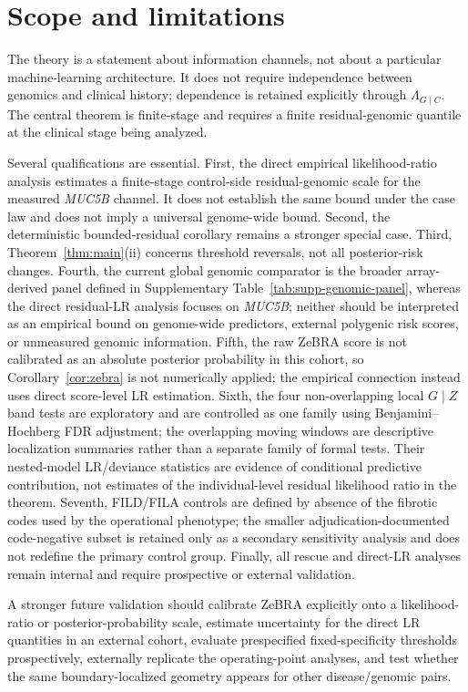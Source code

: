 \section{Scope and limitations}

The theory is a statement about information channels, not about a particular machine-learning architecture. It does not require independence between genomics and clinical history; dependence is retained explicitly through $\Lambda_{G\mid C}$. The central theorem is finite-stage and requires a finite residual-genomic quantile at the clinical stage being analyzed.

Several qualifications are essential. First, the direct empirical likelihood-ratio analysis estimates a finite-stage control-side residual-genomic scale for the measured \textit{MUC5B} channel. It does not establish the same bound under the case law and does not imply a universal genome-wide bound. Second, the deterministic bounded-residual corollary remains a stronger special case. Third, Theorem~\ref{thm:main}(ii) concerns threshold reversals, not all posterior-risk changes. Fourth, the current global genomic comparator is the broader array-derived panel defined in Supplementary Table~\ref{tab:supp-genomic-panel}, whereas the direct residual-LR analysis focuses on \textit{MUC5B}; neither should be interpreted as an empirical bound on genome-wide predictors, external polygenic risk scores, or unmeasured genomic information. Fifth, the raw ZeBRA score is not calibrated as an absolute posterior probability in this cohort, so Corollary~\ref{cor:zebra} is not numerically applied; the empirical connection instead uses direct score-level LR estimation. Sixth, the four non-overlapping local $G\mid Z$ band tests are exploratory and are controlled as one family using Benjamini--Hochberg FDR adjustment; the overlapping moving windows are descriptive localization summaries rather than a separate family of formal tests. Their nested-model LR/deviance statistics are evidence of conditional predictive contribution, not estimates of the individual-level residual likelihood ratio in the theorem. Seventh, FILD/FILA controls are defined by absence of the fibrotic codes used by the operational phenotype; the smaller adjudication-documented code-negative subset is retained only as a secondary sensitivity analysis and does not redefine the primary control group. Finally, all rescue and direct-LR analyses remain internal and require prospective or external validation.

A stronger future validation should calibrate ZeBRA explicitly onto a likelihood-ratio or posterior-probability scale, estimate uncertainty for the direct LR quantities in an external cohort, evaluate prespecified fixed-specificity thresholds prospectively, externally replicate the operating-point analyses, and test whether the same boundary-localized geometry appears for other disease/genomic pairs.

